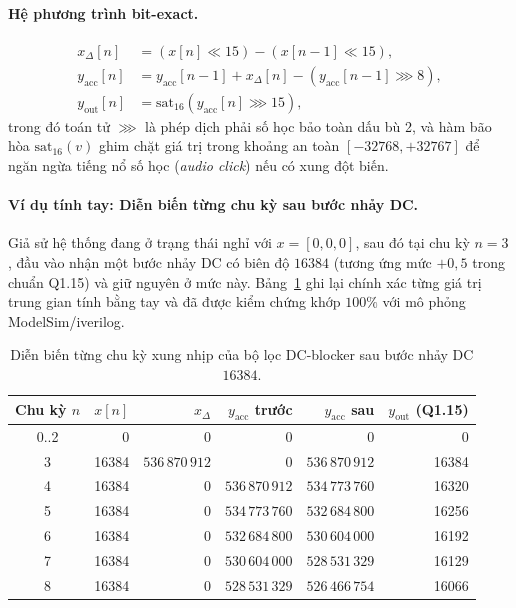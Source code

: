 \paragraph{Hệ phương trình bit-exact.}
\begin{align}
x_{\Delta}[n] &= (x[n] \ll 15) - (x[n-1] \ll 15),\\
y_{\mathrm{acc}}[n] &= y_{\mathrm{acc}}[n-1] + x_{\Delta}[n] - (y_{\mathrm{acc}}[n-1] \ggg 8),\\
y_{\mathrm{out}}[n] &= \mathrm{sat}_{16}(y_{\mathrm{acc}}[n] \ggg 15),
\end{align}
trong đó toán tử $\ggg$ là phép dịch phải số học bảo toàn dấu bù 2, và hàm bão hòa $\mathrm{sat}_{16}(v)$ ghim chặt giá trị trong khoảng an toàn $[-32768, +32767]$ để ngăn ngừa tiếng nổ số học (\emph{audio click}) nếu có xung đột biến.

\paragraph{Ví dụ tính tay: Diễn biến từng chu kỳ sau bước nhảy DC.}
Giả sử hệ thống đang ở trạng thái nghỉ với $x = [0, 0, 0]$, sau đó tại chu kỳ $n = 3$, đầu vào nhận một bước nhảy DC có biên độ $16384$ (tương ứng mức $+0{,}5$ trong chuẩn Q1.15) và giữ nguyên ở mức này. Bảng~\ref{tab:ch03_cycle_exact} ghi lại chính xác từng giá trị trung gian tính bằng tay và đã được kiểm chứng khớp $100\%$ với mô phỏng ModelSim/iverilog.

\begin{table}[H]
\centering
\small
\caption{Diễn biến từng chu kỳ xung nhịp của bộ lọc DC-blocker sau bước nhảy DC $16384$.}
\label{tab:ch03_cycle_exact}
\begin{tabular}{@{}crrrrr@{}}
\toprule
Chu kỳ $n$ & $x[n]$ & $x_{\Delta}$ & $y_{\mathrm{acc}}$ trước & $y_{\mathrm{acc}}$ sau & $y_{\mathrm{out}}$ (Q1.15) \\
\midrule
0..2 & 0 & 0 & 0 & 0 & 0 \\
3 & 16384 & $536\,870\,912$ & 0 & $536\,870\,912$ & 16384 \\
4 & 16384 & 0 & $536\,870\,912$ & $534\,773\,760$ & 16320 \\
5 & 16384 & 0 & $534\,773\,760$ & $532\,684\,800$ & 16256 \\
6 & 16384 & 0 & $532\,684\,800$ & $530\,604\,000$ & 16192 \\
7 & 16384 & 0 & $530\,604\,000$ & $528\,531\,329$ & 16129 \\
8 & 16384 & 0 & $528\,531\,329$ & $526\,466\,754$ & 16066 \\
\bottomrule
\end{tabular}
\end{table}


